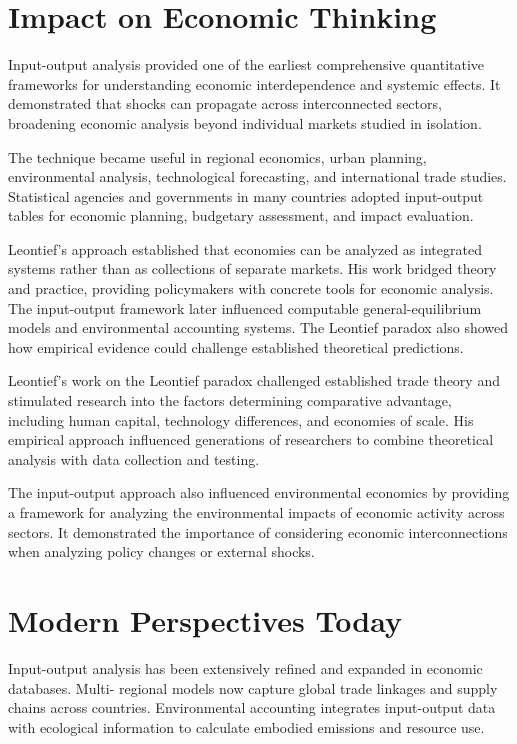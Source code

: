 \section{Impact on Economic Thinking}
Input-output analysis provided one of the earliest comprehensive quantitative frameworks for
understanding economic interdependence and systemic effects. It demonstrated that shocks can
propagate across interconnected sectors, broadening economic analysis beyond individual markets
studied in isolation.

The technique became useful in regional economics, urban planning, environmental analysis,
technological forecasting, and international trade studies. Statistical agencies and governments
in many countries adopted input-output tables for economic planning, budgetary assessment, and
impact evaluation.

Leontief's approach established that economies can be analyzed as integrated systems rather than
as collections of separate markets. His work bridged theory and practice, providing policymakers
with concrete tools for economic analysis. The input-output framework later influenced computable
general-equilibrium models and environmental accounting systems. The Leontief paradox also showed
how empirical evidence could challenge established theoretical predictions.

Leontief's work on the Leontief paradox challenged established trade theory and stimulated
research into the factors determining comparative advantage, including human capital, technology
differences, and economies of scale. His empirical approach influenced generations of researchers
to combine theoretical analysis with data collection and testing.

The input-output approach also influenced environmental economics by providing a framework for
analyzing the environmental impacts of economic activity across sectors. It demonstrated the
importance of considering economic interconnections when analyzing policy changes or external
shocks.

\section{Modern Perspectives Today}
Input-output analysis has been extensively refined and expanded in economic databases. Multi-
regional models now capture global trade linkages and supply chains across countries. Environmental
accounting integrates input-output data with ecological information to calculate embodied emissions
and resource use.


